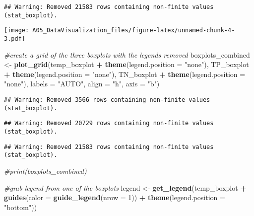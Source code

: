 \documentclass[]{article}
\newenvironment{Shaded}{\begin{snugshade}}{\end{snugshade}}
\newcommand{\CommentTok}[1]{\textcolor[rgb]{0.56,0.35,0.01}{\textit{#1}}}
\newcommand{\DataTypeTok}[1]{\textcolor[rgb]{0.13,0.29,0.53}{#1}}
\newcommand{\DecValTok}[1]{\textcolor[rgb]{0.00,0.00,0.81}{#1}}
\newcommand{\KeywordTok}[1]{\textcolor[rgb]{0.13,0.29,0.53}{\textbf{#1}}}
\newcommand{\NormalTok}[1]{#1}
\newcommand{\OperatorTok}[1]{\textcolor[rgb]{0.81,0.36,0.00}{\textbf{#1}}}
\newcommand{\StringTok}[1]{\textcolor[rgb]{0.31,0.60,0.02}{#1}}
\begin{document}
\begin{verbatim}
## Warning: Removed 21583 rows containing non-finite values (stat_boxplot).
\end{verbatim}

\texttt{[image: A05\_DataVisualization\_files/figure-latex/unnamed-chunk-4-3.pdf]}

\begin{Shaded}
\begin{Highlighting}[]
\CommentTok{#create a grid of the three boxplots with the legends removed}
\NormalTok{boxplots_combined <-}\StringTok{ }\KeywordTok{plot_grid}\NormalTok{(temp_boxplot }\OperatorTok{+}\StringTok{ }\KeywordTok{theme}\NormalTok{(}\DataTypeTok{legend.position =} \StringTok{"none"}\NormalTok{), }
\NormalTok{          TP_boxplot }\OperatorTok{+}\StringTok{ }\KeywordTok{theme}\NormalTok{(}\DataTypeTok{legend.position =} \StringTok{"none"}\NormalTok{), }
\NormalTok{          TN_boxplot }\OperatorTok{+}\StringTok{ }\KeywordTok{theme}\NormalTok{(}\DataTypeTok{legend.position =} \StringTok{"none"}\NormalTok{),}
          \DataTypeTok{labels =} \StringTok{"AUTO"}\NormalTok{, }
          \DataTypeTok{align =} \StringTok{"h"}\NormalTok{, }
          \DataTypeTok{axis =} \StringTok{"b"}\NormalTok{)}
\end{Highlighting}
\end{Shaded}

\begin{verbatim}
## Warning: Removed 3566 rows containing non-finite values (stat_boxplot).
\end{verbatim}

\begin{verbatim}
## Warning: Removed 20729 rows containing non-finite values (stat_boxplot).
\end{verbatim}

\begin{verbatim}
## Warning: Removed 21583 rows containing non-finite values (stat_boxplot).
\end{verbatim}

\begin{Shaded}
\begin{Highlighting}[]
\CommentTok{#print(boxplots_combined) }

\CommentTok{#grab legend from one of the boxplots }
\NormalTok{legend <-}\StringTok{ }\KeywordTok{get_legend}\NormalTok{(temp_boxplot }\OperatorTok{+}\StringTok{ }\KeywordTok{guides}\NormalTok{(}\DataTypeTok{color =} \KeywordTok{guide_legend}\NormalTok{(}\DataTypeTok{nrow =} \DecValTok{1}\NormalTok{)) }\OperatorTok{+}
\StringTok{                       }\KeywordTok{theme}\NormalTok{(}\DataTypeTok{legend.position =} \StringTok{"bottom"}\NormalTok{))}
\end{Highlighting}
\end{Shaded}
\end{document}
